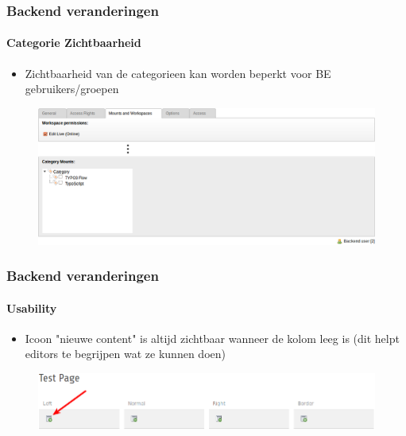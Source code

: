 
\begin{frame}[fragile]
	\frametitle{Backend veranderingen}
	\framesubtitle{Categorie Zichtbaarheid}

 	\begin{itemize}
		\item Zichtbaarheid van de categorieen kan worden beperkt voor BE gebruikers/groepen
	\end{itemize}

	\begin{figure}
		\includegraphics[width=0.95\linewidth]{Images/BackendChanges/CategoryVisibility.png}
	\end{figure}

\end{frame}


\begin{frame}[fragile]
	\frametitle{Backend veranderingen}
	\framesubtitle{Usability}

 	\begin{itemize}
		\item Icoon "nieuwe content" is altijd zichtbaar wanneer de kolom leeg is
			(dit helpt editors te begrijpen wat ze kunnen doen)
	\end{itemize}

	\begin{figure}
		\includegraphics[width=0.95\linewidth]{Images/BackendChanges/NewContentIconAlwaysVisible.png}
	\end{figure}

\end{frame}

